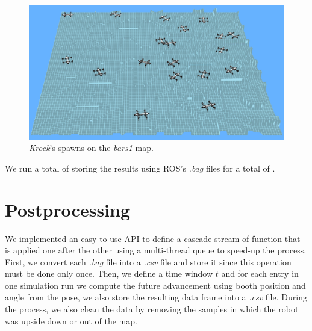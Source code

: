 \documentclass[../document.tex]{subfiles}
\begin{document}
\begin{figure}[H]
\centering
\includegraphics[width=\linewidth]{img/krock-spawn-20-bars1.png}
\caption{\emph{Krock}'s spawns on the \emph{bars1} map.}
\end{figure}
We run a total of  storing the results using ROS's \emph{.bag} files for a total of .
\section{Postprocessing}

We implemented an easy to use API  to define a cascade stream of function that is applied one after the other using a multi-thread queue to speed-up the process.
First, we convert each \emph{.bag} file into a \emph{.csv} file and store it since this operation must be done only once. Then, we define a time window $t$ and for each entry in one simulation run we compute the future advancement using booth position and angle from the pose, we also store the resulting data frame into a \emph{.csv} file. During the process, we also clean the data by removing the samples in which the robot was upside down or out of the map.
\end{document}
